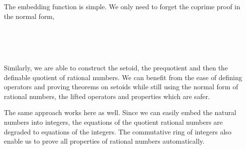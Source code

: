 The embedding function is simple. We only need to forget the coprime proof in the normal form,

\begin{code}
\\
\> \AgdaSymbol{:}   \<%
\\
\>   \AgdaSymbol{=} \AgdaSymbol{(} \AgdaSymbol{(} \AgdaSymbol{))}  \AgdaSymbol{(} \AgdaSymbol{)}\<%
\\
\end{code} 

Similarly, we are able to construct the setoid, the prequotient and
then the definable quotient of rational numbers. We can benefit from
the ease of defining operators and proving theorems on setoids while
still using the normal form of rational numbers, the lifted operators
and properties which are safer.

The same approach works here as well. Since we can easily embed the natural numbers into integers, the
equations of the quotient rational numbers are degraded to equations of the
integers.  The commutative ring of integers also enable us to prove
all properties of rational numbers automatically.

